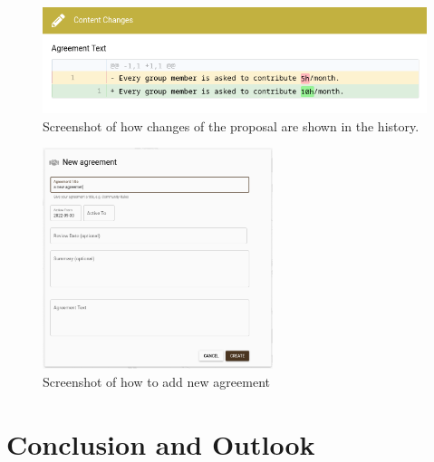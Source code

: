 \documentclass[
	a4paper,%
	11pt,%
	]{article}
\begin{document}
\begin{figure}[p]
	\includegraphics[width=.8\textwidth,
	]{images/changes-view.png}
	\caption{Screenshot of how changes of the proposal are shown in the history.}
	\label{fig:screenshot-changes}
\end{figure}

\begin{figure}[p]
\centering
	\includegraphics[width=0.6\textwidth,
	]{images/create_agreement.png}
	\caption{Screenshot of how to add new agreement}
	\label{fig:screenshot-create-agreement}
\end{figure}



\section{Conclusion and Outlook} \label{sec:outlook}
\end{document}

